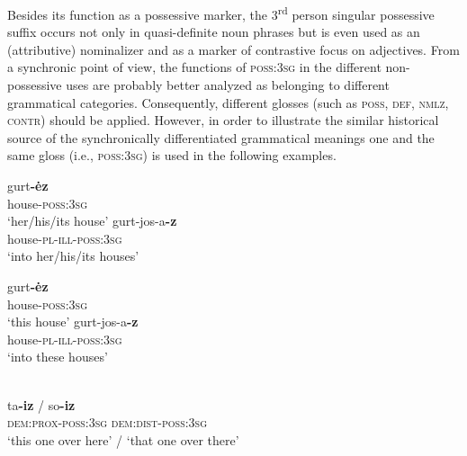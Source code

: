 Besides its function as a possessive marker, the 3\textsuperscript{rd} person singular possessive suffix occurs not only in quasi-definite noun phrases but is even used as an (attributive) nominalizer and as a marker of contrastive focus on adjectives. From a synchronic point of view, the functions of \textsc{poss:3sg} in the different non-possessive uses are probably better analyzed as belonging to different grammatical categories. Consequently, different glosses (such as \textsc{poss, def, nmlz, contr}) should be applied. However, in order to illustrate the similar historical source of the synchronically differentiated grammatical meanings one and the same gloss (i.e., \textsc{poss:3sg}) is used in the following examples.
\begin{exe}
\begin{xlist}
\label{udmurt possmarking}
\begin{xlist}
\ex	
\gll	gurt\textbf{-ėz}\\
	house-\textsc{poss:3sg}\\
\glt	‘her/his/its house’
\ex	
\gll	gurt-jos-a\textbf{-z}\\
	house-\textsc{pl}-\textsc{ill}-\textsc{poss:3sg}\\
\glt	‘into her/his/its houses’
\end{xlist}
\begin{xlist}
\ex	
\gll	gurt\textbf{-ėz}\\
	house-\textsc{poss:3sg}\\
\glt	‘this house’
\ex	
\gll	gurt-jos-a\textbf{-z}\\
	house-\textsc{pl}-\textsc{ill}-\textsc{poss:3sg}\\
\glt	‘into these houses’
\end{xlist}
\label{udmurt diachr nomzr}
\begin{xlist}
\\
\label{udmurt diachr dem-nomzr}
\gll	ta\textbf{-iz} / so\textbf{-iz}\\
 	\textsc{dem:prox}-\textsc{poss:3sg} {} \textsc{dem:dist}-\textsc{poss:3sg}\\
\glt	‘this one over here’ / ‘that one over there’


\end{xlist}
\end{xlist}
\end{exe}
